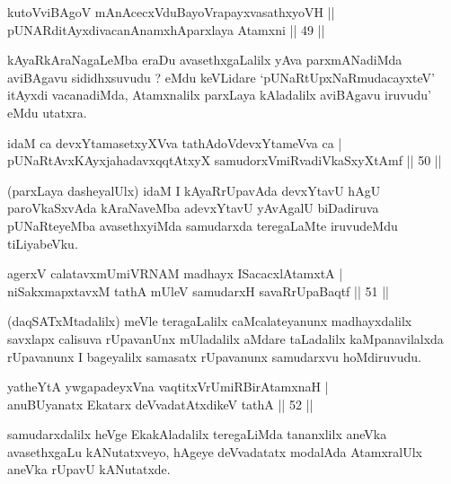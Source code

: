 \begin{shl}
kutoV\s viBAgoV mAnAcecxVduBayoVrapayxvasathxyoVH ||  \\
pUNARditAyxdivacanAnamxhAparxlaya Atamxni \hfill||  49 ||  
\end{shl}

\begin{artha}
kAyaRkAraNagaLeMba eraDu avasethxgaLalilx yAva parxmANadiMda aviBAgavu sididhxsuvudu ? eMdu keVLidare `pUNaRtUpxNaRmudacayxteV' itAyxdi vacanadiMda, Atamxnalilx parxLaya kAladalilx aviBAgavu iruvudu' eMdu utatxra.
\end{artha}

\begin{shl}
idaM ca devxYtamasetxyXVva tathA\s doV\s devxYtameVva ca  | \\
pUNaRtAvxKAyxja{\null}hadavxqqtAtxyX samudorxVmiRvadiVkaSxyXtAmf \hfill||  50 ||  
\end{shl}

\begin{artha}
(parxLaya dasheyalUlx) idaM I kAyaRrUpavAda devxYtavU hAgU paroVkaSxvAda kAraNaveMba adevxYtavU yAvAgalU biDadiruva pUNaRteyeMba avasethxyiMda samudarxda teregaLaMte iruvudeMdu tiLiyabeVku.
\end{artha}

\begin{shl}
agerxV calatavxmUmiVRNAM madhayx ISacacxlAtamxtA  | \\
niSakxmapxtavxM tathA mUleV samudarxH savaRrUpaBaqtf \hfill||  51 ||  
\end{shl}

\begin{artha}
(daqSATxMtadalilx) meVle teragaLalilx caMcalateyanunx madhayxdalilx savxlapx calisuva rUpavanUnx mUladalilx aMdare taLadalilx kaMpanavilalxda rUpavanunx I bageyalilx samasatx rUpavanunx samudarxvu hoMdiruvudu.
\end{artha}

\begin{shl}
yatheYtA ywgapadeyxVna vaqtitxVrUmiRBirAtamxnaH  | \\
anuBUyanatx Ekatarx deVvadatAtxdikeV tathA \hfill||  52 ||  
\end{shl}

\begin{artha}
samudarxdalilx heVge EkakAladalilx teregaLiMda tananxlilx aneVka avasethxgaLu kANutatxveyo, hAgeye deVvadatatx modalAda AtamxralUlx aneVka rUpavU kANutatxde.
\end{artha}


